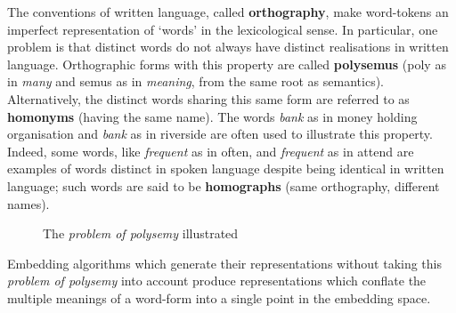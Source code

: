 The conventions of written language, called \textbf{orthography}, make word-tokens an imperfect representation of `words' in the lexicological sense. In particular, one problem is that distinct words do not always have distinct realisations in written language. Orthographic forms with this property are called \textbf{polysemus} (poly as in \emph{many} and semus as in \emph{meaning}, from the same root as semantics). Alternatively, the distinct words sharing this same form are referred to as \textbf{homonyms} (having the same name). The words \emph{bank} as in money holding organisation and \emph{bank} as in riverside are often used to illustrate this property. Indeed, some words, like \emph{frequent} as in often, and \emph{frequent} as in attend are examples of words distinct in spoken language despite being identical in written language; such words are said to be \textbf{homographs} (same orthography, different names).

\begin{figure}[!ht]
 \centering
 
 \caption{The \emph{problem of polysemy} illustrated}
\end{figure}

Embedding algorithms which generate their representations without taking this \emph{problem of polysemy} into account produce representations which conflate the multiple meanings of a word-form into a single point in the embedding space.
